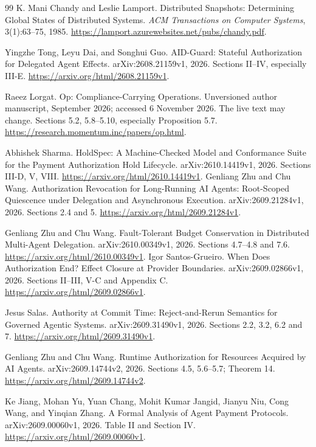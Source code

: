 \begin{thebibliography}{99}
K. Mani Chandy and Leslie Lamport.
Distributed Snapshots: Determining Global States of Distributed Systems.
\emph{ACM Transactions on Computer Systems}, 3(1):63--75, 1985.
\url{https://lamport.azurewebsites.net/pubs/chandy.pdf}.

Yingzhe Tong, Leyu Dai, and Songhui Guo.
AID-Guard: Stateful Authorization for Delegated Agent Effects.
arXiv:2608.21159v1, 2026.
Sections II--IV, especially III-E.
\url{https://arxiv.org/html/2608.21159v1}.

Raeez Lorgat. Op: Compliance-Carrying Operations.
Unversioned author manuscript, September 2026; accessed 6 November 2026.
The live text may change.
Sections 5.2, 5.8--5.10, especially Proposition 5.7.
\url{https://research.momentum.inc/papers/op.html}.

Abhishek Sharma.
HoldSpec: A Machine-Checked Model and Conformance Suite for the Payment
Authorization Hold Lifecycle.
arXiv:2610.14419v1, 2026. Sections III-D, V, VIII.
\url{https://arxiv.org/html/2610.14419v1}.
Genliang Zhu and Chu Wang.
Authorization Revocation for Long-Running AI Agents: Root-Scoped Quiescence
under Delegation and Asynchronous Execution.
arXiv:2609.21284v1, 2026. Sections 2.4 and 5.
\url{https://arxiv.org/html/2609.21284v1}.

Genliang Zhu and Chu Wang.
Fault-Tolerant Budget Conservation in Distributed Multi-Agent Delegation.
arXiv:2610.00349v1, 2026. Sections 4.7--4.8 and 7.6.
\url{https://arxiv.org/html/2610.00349v1}.
Igor Santos-Grueiro.
When Does Authorization End? Effect Closure at Provider Boundaries.
arXiv:2609.02866v1, 2026. Sections II--III, V-C and Appendix C.
\url{https://arxiv.org/html/2609.02866v1}.

Jesus Salas.
Authority at Commit Time: Reject-and-Rerun Semantics for Governed Agentic Systems.
arXiv:2609.31490v1, 2026. Sections 2.2, 3.2, 6.2 and 7.
\url{https://arxiv.org/html/2609.31490v1}.

Genliang Zhu and Chu Wang.
Runtime Authorization for Resources Acquired by AI Agents.
arXiv:2609.14744v2, 2026. Sections 4.5, 5.6--5.7; Theorem 14.
\url{https://arxiv.org/html/2609.14744v2}.

Ke Jiang, Mohan Yu, Yuan Chang, Mohit Kumar Jangid, Jianyu Niu,
Cong Wang, and Yinqian Zhang.
A Formal Analysis of Agent Payment Protocols.
arXiv:2609.00060v1, 2026. Table II and Section IV.
\url{https://arxiv.org/html/2609.00060v1}.


\end{thebibliography}
